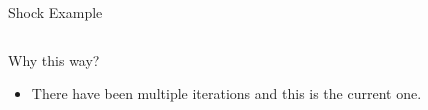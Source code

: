 \documentclass[
  ignorenonframetext,
]{beamer}
\providecommand{\tightlist}{%
  \setlength{\itemsep}{0pt}\setlength{\parskip}{0pt}}
\begin{document}
\begin{frame}{Shock Example}
\protect\hypertarget{shock-example}{}

\begin{columns}[T]
\begin{column}{0.6\textwidth}
\end{column}

\begin{column}{0.4\textwidth}
\end{column}
\end{columns}

\end{frame}

\begin{frame}{Why this way?}
\protect\hypertarget{why-this-way}{}

\begin{itemize}
\tightlist
\item
  There have been multiple iterations and this is the current one.
\end{itemize}

\end{frame}
\end{document}
